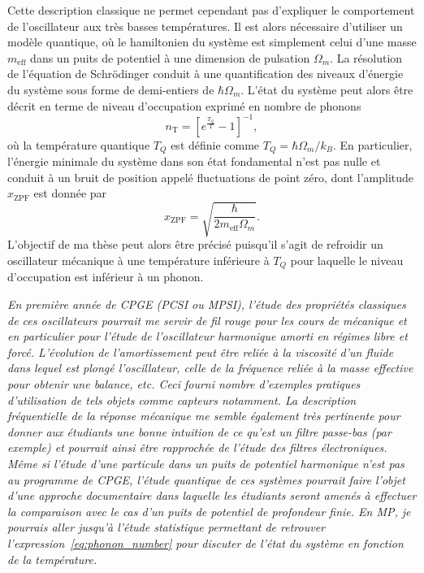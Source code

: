 \documentclass[12pt,a4paper]{article}
\begin{document}
Cette description classique ne permet cependant pas d'expliquer le comportement de l'oscillateur aux très basses températures.
Il est alors nécessaire d'utiliser un modèle quantique, où le hamiltonien du système est simplement celui d'une masse $m_\mathrm{eff}$ dans un puits de potentiel à une dimension de pulsation $\Omega_m$.
La résolution de l'équation de Schrödinger conduit à une quantification des niveaux d'énergie du système sous forme de demi-entiers de $\hbar\Omega_m$.
L'état du système peut alors être décrit en terme de niveau d'occupation exprimé en nombre de phonons
\begin{equation}
n_\mathrm{T} = \left[ e^\frac{T_Q}{T} -1\right]^{-1},
\label{eq:phonon_number}
\end{equation}
où la température quantique $T_Q$ est définie comme $T_Q = \hbar\Omega_m/k_B$.
En particulier, l'énergie minimale du système dans son état fondamental n'est pas nulle et conduit à un bruit de position appelé fluctuations de point zéro, dont l'amplitude $x_\mathrm{ZPF}$ est donnée par
\begin{equation}
x_\mathrm{ZPF}=\sqrt{\frac{\hbar}{2m_\mathrm{eff}\Omega_m}}.
\end{equation}
L'objectif de ma thèse peut alors être précisé puisqu'il s'agit de refroidir un oscillateur mécanique à une température inférieure à $T_Q$ pour laquelle le niveau d'occupation est inférieur à un phonon.

\emph{En première année de CPGE (PCSI ou MPSI), l'étude des propriétés classiques de ces oscillateurs pourrait me servir de fil rouge pour les cours de mécanique et en particulier pour l'étude de l'oscillateur harmonique amorti en régimes libre et forcé.
L'évolution de l'amortissement peut être reliée à la viscosité d'un fluide dans lequel est plongé l'oscillateur, celle de la fréquence reliée à la masse effective pour obtenir une balance, etc.
Ceci fourni nombre d'exemples pratiques d'utilisation de tels objets comme capteurs notamment.
La description fréquentielle de la réponse mécanique me semble également très pertinente pour donner aux étudiants une bonne intuition de ce qu'est un filtre passe-bas (par exemple) et pourrait ainsi être rapprochée de l'étude des filtres électroniques.}
\emph{Même si l'étude d'une particule dans un puits de potentiel harmonique n'est pas au programme de CPGE, l'étude quantique de ces systèmes pourrait faire l'objet d'une approche documentaire dans laquelle les étudiants seront amenés à effectuer la comparaison avec le cas d'un puits de potentiel de profondeur finie.
En MP, je pourrais aller jusqu'à l'étude statistique permettant de retrouver l'expression~\ref{eq:phonon_number} pour discuter de l'état du système en fonction de la température.}
\end{document}
